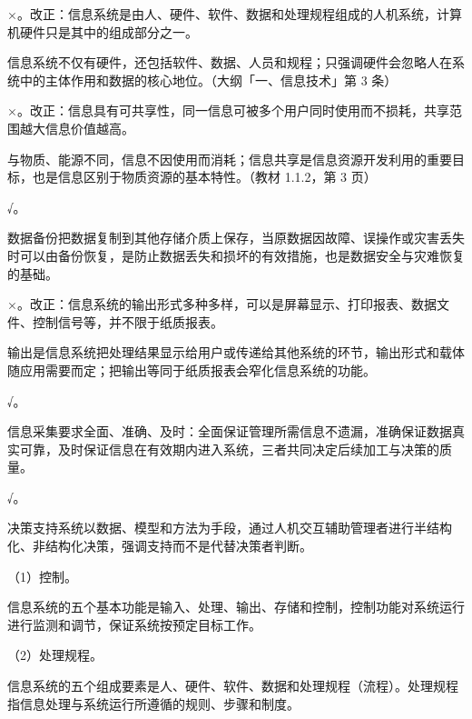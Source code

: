\documentclass[a4paper,11pt]{article}
\begin{document}

\q ×。改正：信息系统是由人、硬件、软件、数据和处理规程组成的人机系统，计算机硬件只是其中的组成部分之一。\begin{analysis}信息系统不仅有硬件，还包括软件、数据、人员和规程；只强调硬件会忽略人在系统中的主体作用和数据的核心地位。（大纲「一、信息技术」第 3 条）\end{analysis}

\q ×。改正：信息具有可共享性，同一信息可被多个用户同时使用而不损耗，共享范围越大信息价值越高。\begin{analysis}与物质、能源不同，信息不因使用而消耗；信息共享是信息资源开发利用的重要目标，也是信息区别于物质资源的基本特性。（教材 1.1.2，第 3 页）\end{analysis}

\q √。\begin{analysis}数据备份把数据复制到其他存储介质上保存，当原数据因故障、误操作或灾害丢失时可以由备份恢复，是防止数据丢失和损坏的有效措施，也是数据安全与灾难恢复的基础。\end{analysis}

\q ×。改正：信息系统的输出形式多种多样，可以是屏幕显示、打印报表、数据文件、控制信号等，并不限于纸质报表。\begin{analysis}输出是信息系统把处理结果显示给用户或传递给其他系统的环节，输出形式和载体随应用需要而定；把输出等同于纸质报表会窄化信息系统的功能。\end{analysis}

\q √。\begin{analysis}信息采集要求全面、准确、及时：全面保证管理所需信息不遗漏，准确保证数据真实可靠，及时保证信息在有效期内进入系统，三者共同决定后续加工与决策的质量。\end{analysis}

\q √。\begin{analysis}决策支持系统以数据、模型和方法为手段，通过人机交互辅助管理者进行半结构化、非结构化决策，强调支持而不是代替决策者判断。\end{analysis}


\q （1）控制。\begin{analysis}信息系统的五个基本功能是输入、处理、输出、存储和控制，控制功能对系统运行进行监测和调节，保证系统按预定目标工作。\end{analysis}

\q （2）处理规程。\begin{analysis}信息系统的五个组成要素是人、硬件、软件、数据和处理规程（流程）。处理规程指信息处理与系统运行所遵循的规则、步骤和制度。\end{analysis}
\end{document}
